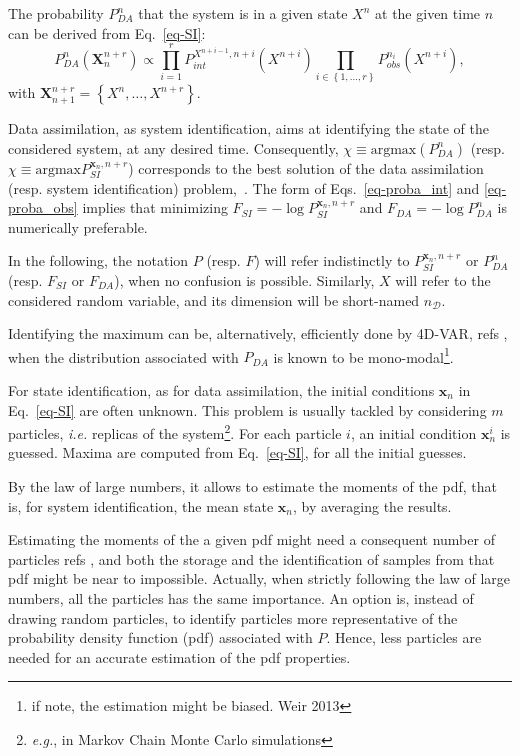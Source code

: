 \documentclass[aip,pof,nofootinbib,reprint,onecolumn]{revtex4-1}
\newcommand{\todo}[1]{{\color{red} #1 }}
\newcommand{\gras}[1]{\boldsymbol{#1}}
\newcommand{\mypar}[1]{\left(#1\right)}
\newcommand{\mya}[1]{\left\{#1\right\}}
\newcommand{\Nphaz}{n_{\mathcal{D}}} %
\newcommand{\Np}{m}
\newcommand{\point}{\gras{x}} %
\newcommand{\rpoint}{X}
\begin{document}
The probability $P^{n}_{DA}$ that the system is in a given state $\rpoint^n$ at the given time $n$ can be derived from Eq.~\eqref{eq-SI}:
\begin{equation}
P^{n}_{DA}\mypar{\gras{\rpoint}_{n}^{n+r}} \propto \prod_{i=1}^r P^{\rpoint^{n+i-1},n+i}_{int}\mypar{\rpoint^{n+i}} \prod_{i\in \mya{1,\hdots,r}} P^{n_i}_{obs}\mypar{\rpoint^{n+i}},
\label{eq-DA}
\end{equation}
with $\gras{\rpoint}_{n+1}^{n+r} = \mya{\rpoint^{n}, \hdots,\rpoint^{n+r}}$.

Data assimilation, as system identification, aims at identifying the state of the considered system, at any desired time. 
Consequently, $\chi \equiv \text{argmax}\mypar{P^{n}_{DA}}$ (resp. $\chi \equiv \text{argmax}P^{\point_n,n+r}_{SI}$) corresponds to the best solution of the data assimilation (resp. system identification) problem,~\cite{Chorin2010,Morzfeld2012,Atkins2013}. 
The form of Eqs.~\eqref{eq-proba_int} and \eqref{eq-proba_obs} implies that minimizing $F_{SI} = -\log P^{\point_n,n+r}_{SI}$ and $F_{DA} = -\log P^{n}_{DA}$ is numerically preferable.


In the following, the notation $P$ (resp. $F$) will refer indistinctly to $P^{\point_n,n+r}_{SI}$ or $P^{n}_{DA}$ (resp. $F_{SI}$ or $F_{DA}$), when no confusion is possible. 
Similarly, $X$ will refer to the considered random variable, and its dimension will be short-named $\Nphaz$.

Identifying the maximum can be, alternatively, efficiently done by 4D-VAR, \todo{refs}, when the distribution associated with $P_{DA}$ is known to be mono-modal\footnote{if note, the estimation might be biased. Weir 2013}.

For state identification, as for data assimilation, the initial conditions $\point_n$ in Eq.~\eqref{eq-SI} are often unknown. 
This problem is usually tackled by considering $\Np$ particles, \emph{i.e.} replicas of the system\footnote{\emph{e.g.}, in Markov Chain Monte Carlo simulations}.
For each particle $i$, an initial condition $\point_n^i$ is guessed. 
Maxima are computed from Eq.~\eqref{eq-SI}, for all the initial guesses. 

By the law of large numbers, it allows to estimate the moments of the pdf, that is, for system identification, the mean state $\point_n$, by averaging the results. 


Estimating the moments of the a given pdf might need a consequent number of particles\todo{refs}, and both the storage and the identification of samples from that pdf might be near to impossible.
Actually, when strictly following the law of large numbers, all the particles has the same importance.
An option is, instead of drawing random particles, to identify particles more representative of the probability density function (pdf) associated with $P$. 
Hence, less particles are needed for an accurate estimation of the pdf properties.
\end{document}
